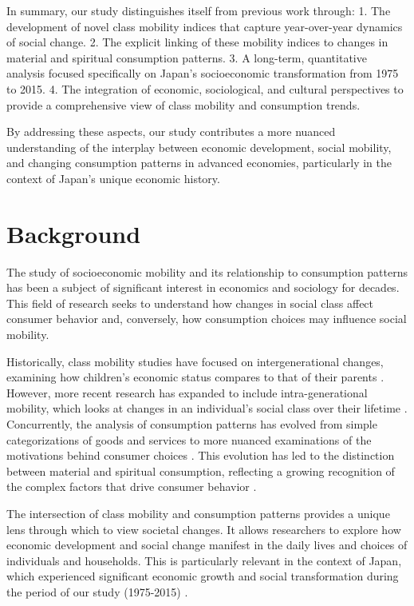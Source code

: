 \documentclass{article} %
\begin{document}
In summary, our study distinguishes itself from previous work through:
1. The development of novel class mobility indices that capture year-over-year dynamics of social change.
2. The explicit linking of these mobility indices to changes in material and spiritual consumption patterns.
3. A long-term, quantitative analysis focused specifically on Japan's socioeconomic transformation from 1975 to 2015.
4. The integration of economic, sociological, and cultural perspectives to provide a comprehensive view of class mobility and consumption trends.

By addressing these aspects, our study contributes a more nuanced understanding of the interplay between economic development, social mobility, and changing consumption patterns in advanced economies, particularly in the context of Japan's unique economic history.

\section{Background}
\label{sec:background}

The study of socioeconomic mobility and its relationship to consumption patterns has been a subject of significant interest in economics and sociology for decades. This field of research seeks to understand how changes in social class affect consumer behavior and, conversely, how consumption choices may influence social mobility.

Historically, class mobility studies have focused on intergenerational changes, examining how children's economic status compares to that of their parents \citep{Erikson1993TheCF}. However, more recent research has expanded to include intra-generational mobility, which looks at changes in an individual's social class over their lifetime \citep{Esping-Andersen1993ChangingC}. Concurrently, the analysis of consumption patterns has evolved from simple categorizations of goods and services to more nuanced examinations of the motivations behind consumer choices \citep{Cwiertka2018ConsumingLI}. This evolution has led to the distinction between material and spiritual consumption, reflecting a growing recognition of the complex factors that drive consumer behavior \citep{Huaiju2014EthicalIO}.

The intersection of class mobility and consumption patterns provides a unique lens through which to view societal changes. It allows researchers to explore how economic development and social change manifest in the daily lives and choices of individuals and households. This is particularly relevant in the context of Japan, which experienced significant economic growth and social transformation during the period of our study (1975-2015) \citep{Okazaki2017HistoryOT}.
\end{document}
